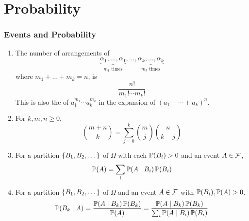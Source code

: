 \documentclass{styles/note}
\begin{document}
\newpage
\part{Probability}

\section{Events and Probability}
  
  \begin{enumerate}[label=(\alph*)]
    \item The number of arrangements of
      \[ \underbrace{\alpha_1, \dots, \alpha_1}_\textrm{$m_1$ times}, \dots, \underbrace{\alpha_k, \dots, \alpha_k}_\textrm{$m_k$ times} \]
      where $m_1 + \dots + m_k = n$, is
      \begin{equation}
        \frac{n!}{m_1! \cdots m_k!}
      \end{equation}
      This is also the  of $a_1^{m_1} \cdots a_k^{m_k}$ in the expansion of $(a_1 + \cdots + a_k)^n$.
    

    \item {}
      For $k, m, n \geqslant 0$,
      \begin{equation}
        {m + n \choose k} = \sum_{j=0}^k {m \choose j} {n \choose k - j}
      \end{equation}
    
    \item {}
      For a partition $\set{B_1, B_2, \dots}$ of $\Omega$ with each $\operatorname{\mathbb{P}}(B_i) > 0$ and an event $A \in \mathcal{F}$,
      \begin{equation}
        \operatorname{\mathbb{P}}(A) = \sum_{i} \operatorname{\mathbb{P}}(A \mid B_i) \operatorname{\mathbb{P}}(B_i)
      \end{equation}
      
    \item {}
      For a partition $\set{B_1, B_2, \dots}$ of $\Omega$ and an event $A \in \mathcal{F}$ with $\operatorname{\mathbb{P}}(B_i), \operatorname{\mathbb{P}}(A) > 0$,
      \begin{equation}
        \operatorname{\mathbb{P}}(B_k \mid A) = \frac{\operatorname{\mathbb{P}}(A \mid B_k) \operatorname{\mathbb{P}}(B_k)}{\operatorname{\mathbb{P}}(A)} = \frac{\operatorname{\mathbb{P}}(A \mid B_k) \operatorname{\mathbb{P}}(B_k)}{\sum_i \operatorname{\mathbb{P}}(A \mid B_i) \operatorname{\mathbb{P}}(B_i)}
      \end{equation}
    

\end{enumerate}
\end{document}
